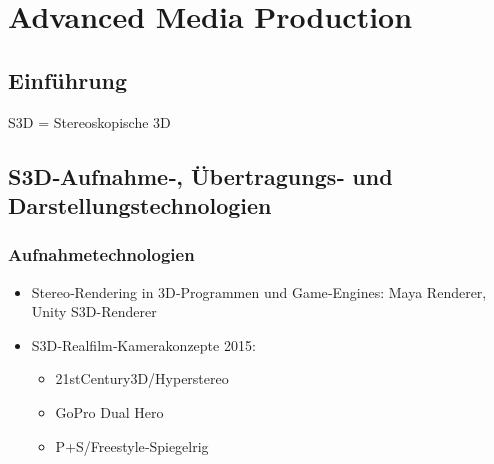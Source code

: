 \chapter{Advanced Media Production}
\section{Einführung}\label{sec:Einführung_AMP}

S3D = Stereoskopische 3D \\

\section{S3D‐Aufnahme‐, Übertragungs‐ und Darstellungstechnologien}

\subsection{Aufnahmetechnologien}
\begin{itemize}

\item Stereo‐Rendering in 3D‐Programmen und Game‐Engines: Maya Renderer, Unity S3D-Renderer
\item S3D‐Realfilm‐Kamerakonzepte 2015:
\begin{itemize}
\item 21stCentury3D/Hyperstereo
\item GoPro Dual Hero
\item P+S/Freestyle‐Spiegelrig
\end{itemize}

\end{itemize}


